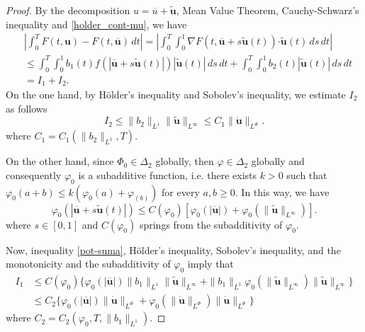 \documentclass[twoside]{article}
\theoremstyle{remark}
\newcommand{\orlnor}{\|_{L^{\Phi}}}
\renewcommand{\b}[1]{\boldsymbol{#1}}
\newcommand{\ccdot}{\b{\cdot}}
\renewcommand{\leq}{\leqslant}
\begin{document}
\begin{proof}
By the decomposition $u=\overline{u}+\b{\tilde{u}}$,  Mean Value Theorem, Cauchy-Schwarz's inequality 
and \eqref{holder_cont-mu}, we have
\begin{equation}\label{cota-diferencia-F}
\begin{split}
&\left|\int_0^T F(t,\b{u})-F(t,\b{\overline{u}})\,dt\right|=
\left|\int_0^T \int_0^1 \nabla F(t,\b{\overline{u}}+s\b{\tilde{u}}(t))\ccdot \b{\tilde{u}}(t) \,ds \,dt\right|
\\
&\leq \int_0^T \int_0^1 b_1(t)f(|\b{\overline{u}}+s\b{\tilde{u}}(t)|)|\b{\tilde{u}}(t)|\,ds\,dt+
\int_0^T \int_0^1 b_2(t)|\b{\tilde{u}}(t)|\,ds\,dt
\\
&=I_1+I_2.
\end{split}
\end{equation}
On the one hand, by H\"older's inequality and Sobolev's inequality, we estimate $I_2$ as follows
\begin{equation}\label{cota-i2}
I_2\leq \|b_2\|_{L^1} \|\b{\tilde{u}}\|_{L^{\infty}}\leq
C_1\|\b{\dot u}\orlnor.
\end{equation}
 where $C_1=C_1(\|b_2\|_{L^1}, T)$. 

On the other hand, since $\Phi_0 \in \Delta_2$ globally, then $\varphi \in \Delta_2$ globally and 
consequently $\varphi_0$ is a subadditive function, i.e. there exists $k>0$ such that 
$\varphi_0(a+b)\leq k(\varphi_0(a)+\varphi_(b))$ for every $a,b\geq 0$.
In this way, we have
\begin{equation}\label{pot-suma}
\varphi_0(|\b{\overline{u}}+s\b{\tilde{u}}(t)|)\leq
C(\varphi_0)[\varphi_0(|\b{\overline{u}}|)+\varphi_0(\|\b{\tilde{u}}\|_{L^{\infty}})].
\end{equation}
where $s \in [0,1]$ and $C(\varphi_0)$ springs from the subadditivity of $\varphi_0$. 

Now,  inequality \eqref{pot-suma}, H\"older's inequality, Sobolev's inequality,
and the monotonicity and the subadditivity of $\varphi_0$ imply that
\begin{equation}\label{cota-i1}
\begin{split}
I_1&
\leq C(\varphi_0)\bigg\{ \varphi_0(|\b{\overline{u}}|) \|b_1\|_{L^1} \|\b{\tilde{u}}\|_{L^{\infty}}+
 \|b_1\|_{L^1}\varphi_0(\|\b{\tilde{u}}\|_{L^\infty})\|\b{\tilde{u}}\|_{L^\infty}\bigg\}
\\
&\leq C_2 \bigg\{ \varphi_0(|\b{\overline{u}}|) \|\b{\dot{u}}\orlnor
+\varphi_0(\|\b{\dot u}\orlnor) \|\b{\dot u}\orlnor\bigg\}
\end{split}
\end{equation}
where $C_2=C_2(\varphi_0,T, \|b_1\|_{L^1} )$. 


\end{proof}
\end{document}
